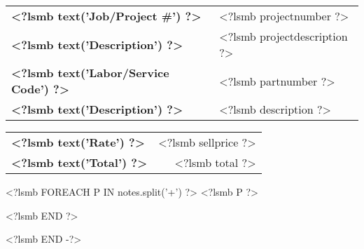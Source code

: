 \begin{tabular}[b]{ll}
  \textbf{<?lsmb text('Job/Project #') ?>} & <?lsmb projectnumber ?> \\
  \textbf{<?lsmb text('Description') ?>} & <?lsmb projectdescription ?> \\
  \textbf{<?lsmb text('Labor/Service Code') ?>} & <?lsmb partnumber ?> \\
  \textbf{<?lsmb text('Description') ?>} & <?lsmb description ?> \\
\end{tabular}
\hfill
\begin{tabular}[b]{lr}
  \textbf{<?lsmb text('Rate') ?>} & <?lsmb sellprice ?> \\
  \textbf{<?lsmb text('Total') ?>} & <?lsmb total ?> \\
\end{tabular}
  
\vspace{0.3cm}

<?lsmb FOREACH P IN notes.split('\n\n+') ?>
<?lsmb P ?>\medskip

<?lsmb END ?>
 

<?lsmb END -?>
